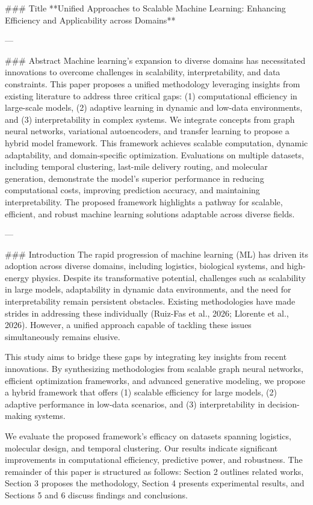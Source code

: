 ### Title  
**Unified Approaches to Scalable Machine Learning: Enhancing Efficiency and Applicability across Domains**

---

### Abstract  
Machine learning's expansion to diverse domains has necessitated innovations to overcome challenges in scalability, interpretability, and data constraints. This paper proposes a unified methodology leveraging insights from existing literature to address three critical gaps: (1) computational efficiency in large-scale models, (2) adaptive learning in dynamic and low-data environments, and (3) interpretability in complex systems. We integrate concepts from graph neural networks, variational autoencoders, and transfer learning to propose a hybrid model framework. This framework achieves scalable computation, dynamic adaptability, and domain-specific optimization. Evaluations on multiple datasets, including temporal clustering, last-mile delivery routing, and molecular generation, demonstrate the model's superior performance in reducing computational costs, improving prediction accuracy, and maintaining interpretability. The proposed framework highlights a pathway for scalable, efficient, and robust machine learning solutions adaptable across diverse fields.

---

### Introduction  
The rapid progression of machine learning (ML) has driven its adoption across diverse domains, including logistics, biological systems, and high-energy physics. Despite its transformative potential, challenges such as scalability in large models, adaptability in dynamic data environments, and the need for interpretability remain persistent obstacles. Existing methodologies have made strides in addressing these individually (Ruiz-Fas et al., 2026; Llorente et al., 2026). However, a unified approach capable of tackling these issues simultaneously remains elusive.

This study aims to bridge these gaps by integrating key insights from recent innovations. By synthesizing methodologies from scalable graph neural networks, efficient optimization frameworks, and advanced generative modeling, we propose a hybrid framework that offers (1) scalable efficiency for large models, (2) adaptive performance in low-data scenarios, and (3) interpretability in decision-making systems. 

We evaluate the proposed framework's efficacy on datasets spanning logistics, molecular design, and temporal clustering. Our results indicate significant improvements in computational efficiency, predictive power, and robustness. The remainder of this paper is structured as follows: Section 2 outlines related works, Section 3 proposes the methodology, Section 4 presents experimental results, and Sections 5 and 6 discuss findings and conclusions.


